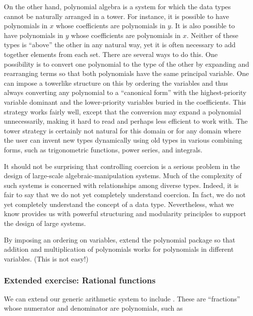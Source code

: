 On the other hand, polynomial algebra is a system for which the data types
cannot be naturally arranged in a tower.  For instance, it is possible to have
polynomials in \( x \) whose coefficients are polynomials in \( y \).  It is also
possible to have polynomials in \( y \) whose coefficients are polynomials in
\( x \).  Neither of these types is ``above'' the other in any natural way, yet
it is often necessary to add together elements from each set.  There are
several ways to do this.  One possibility is to convert one polynomial to the
type of the other by expanding and rearranging terms so that both polynomials
have the same principal variable.  One can impose a towerlike structure on this
by ordering the variables and thus always converting any polynomial to a
``canonical form'' with the highest-priority variable dominant and the
lower-priority variables buried in the coefficients.  This strategy works
fairly well, except that the conversion may expand a polynomial unnecessarily,
making it hard to read and perhaps less efficient to work with.  The tower
strategy is certainly not natural for this domain or for any domain where the
user can invent new types dynamically using old types in various combining
forms, such as trigonometric functions, power series, and integrals.

It should not be surprising that controlling coercion is a serious problem in
the design of large-scale algebraic-manipulation systems.  Much of the
complexity of such systems is concerned with relationships among diverse types.
Indeed, it is fair to say that we do not yet completely understand coercion.
In fact, we do not yet completely understand the concept of a data type.
Nevertheless, what we know provides us with powerful structuring and modularity
principles to support the design of large systems.

\begin{exerciseGroup}
\label{Exercise 2.92}
 By imposing an ordering on
variables, extend the polynomial package so that addition and multiplication of
polynomials works for polynomials in different variables.  (This is not easy!)
\end{exerciseGroup}

\subsubsection*{Extended exercise: Rational functions}

We can extend our generic arithmetic system to include .  These are ``fractions'' whose numerator and denominator are
polynomials, such as

